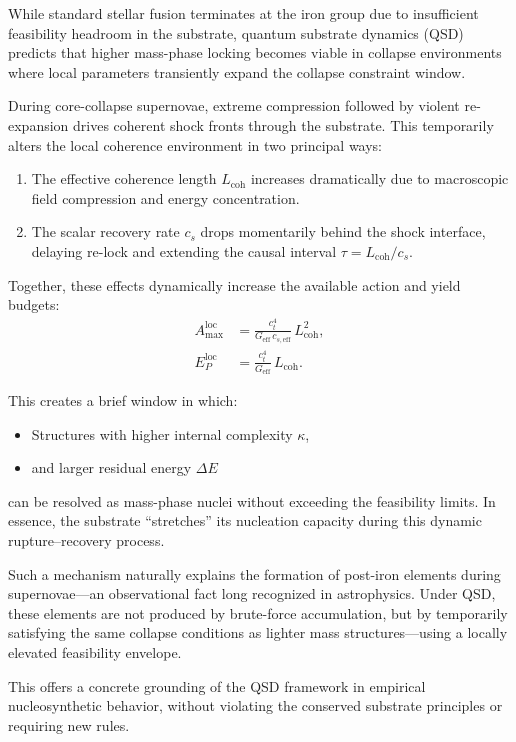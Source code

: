 \documentclass[preprints,article,submit,pdftex,moreauthors]{Definitions/mdpi}
\begin{document}
While standard stellar fusion terminates at the iron group due to insufficient feasibility headroom in the substrate, quantum substrate dynamics (QSD) predicts that higher mass-phase locking becomes viable in collapse environments where local parameters transiently expand the collapse constraint window.

During core-collapse supernovae, extreme compression followed by violent re-expansion drives coherent shock fronts through the substrate. This temporarily alters the local coherence environment in two principal ways:
\begin{enumerate}
    \item The effective coherence length \( L_{\mathrm{coh}} \) increases dramatically due to macroscopic field compression and energy concentration.
    \item The scalar recovery rate \( c_s \) drops momentarily behind the shock interface, delaying re-lock and extending the causal interval \( \tau = L_{\mathrm{coh}} / c_s \).
\end{enumerate}

Together, these effects dynamically increase the available action and yield budgets:
\begin{align}
A_{\max}^{\mathrm{loc}} &= \frac{c_t^4}{G_{\mathrm{eff}}\,c_{s,\mathrm{eff}}}\,L_{\mathrm{coh}}^2, \\[6pt]
E_P^{\mathrm{loc}} &= \frac{c_t^4}{G_{\mathrm{eff}}}\,L_{\mathrm{coh}}.
\end{align}

This creates a brief window in which:
\begin{itemize}
    \item Structures with higher internal complexity \( \kappa \),
    \item and larger residual energy \( \Delta E \)
\end{itemize}
can be resolved as mass-phase nuclei without exceeding the feasibility limits. In essence, the substrate “stretches” its nucleation capacity during this dynamic rupture–recovery process.

Such a mechanism naturally explains the formation of post-iron elements during supernovae—an observational fact long recognized in astrophysics. Under QSD, these elements are not produced by brute-force accumulation, but by temporarily satisfying the same collapse conditions as lighter mass structures—using a locally elevated feasibility envelope.

This offers a concrete grounding of the QSD framework in empirical nucleosynthetic behavior, without violating the conserved substrate principles or requiring new rules.
\end{document}
